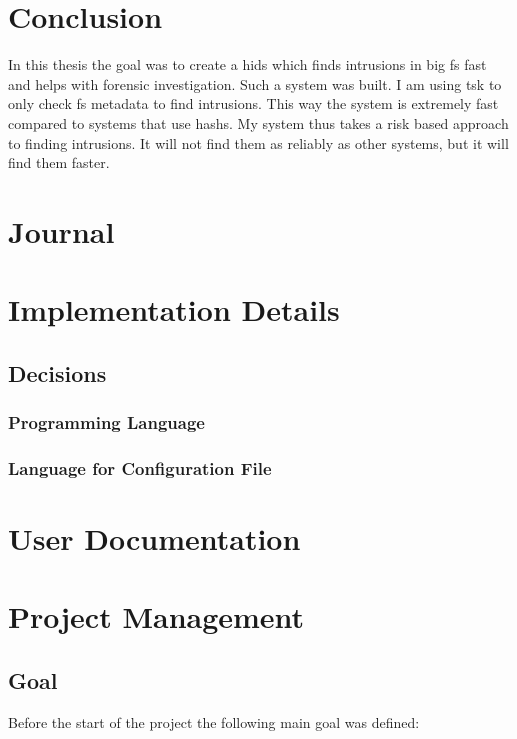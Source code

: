 \documentclass[
	a4paper,					%
	10pt,							%
	twoside,					%
	openright,				%
	notitlepage,			%
	parskip=half,			%
]{scrreprt}					%
\begin{document}
\chapter{Conclusion}
\label{sec:Conclusion}

In this thesis the goal was to create a \gls{hids} which finds intrusions in big \gls{fs} fast and helps with forensic investigation. Such a system was built. I am using \gls{tsk} to only check \gls{fs} \gls{metadata} to find intrusions. This way the system is extremely fast compared to systems that use \glspl{hash}. My system thus takes a risk based approach to finding intrusions. It will not find them as reliably as other systems, but it will find them faster. 


\chapter{Journal}

\chapter{Implementation Details}

\section{Decisions}
\label{sec:decisions}

\subsection{Programming Language}
\label{sec:decisions:language}

\subsection{Language for Configuration File}
\label{sec:decisions:config:language}


\chapter{User Documentation}

\chapter{Project Management}

\section{Goal}
\label{apdx-sec:goal}
Before the start of the project the following main goal was defined:
\end{document}
